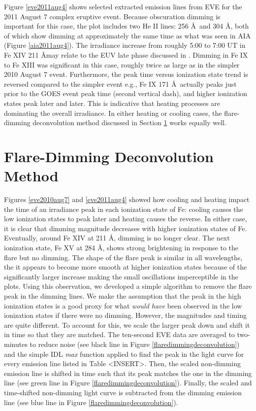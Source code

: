 Figure \ref{eve2011aug4} shows selected extracted emission lines from EVE for the 2011 August 7 complex eruptive event. Because obscuration dimming is important for this case, the plot includes two He II lines: 256 \AA\ and 304 \AA, both of which show dimming at approximately the same time as what was seen in AIA (Figure \ref{aia2011aug4}). The irradiance increase from roughly 5:00 to 7:00 UT in Fe XIV 211 \AA may relate to the EUV late phase discussed in \citet{Woods2011}. Dimming in Fe IX to Fe XIII was significant in this case, roughly twice as large as in the simpler 2010 August 7 event. Furthermore, the peak time versus ionization state trend is reversed compared to the simpler event e.g., Fe IX 171 \AA\ actually peaks just prior to the GOES event peak time (second vertical dash), and higher ionization states peak later and later. This is indicative that heating processes are dominating the overall irradiance. In either heating or cooling cases, the flare-dimming deconvolution method discussed in Section \ref{sec:deconvolve} works equally well. 

\section{Flare-Dimming Deconvolution Method}
\label{sec:deconvolve}
Figures \ref{eve2010aug7} and \ref{eve2011aug4} showed how cooling and heating impact the time of an irradiance peak in each ionization state of Fe: cooling causes the low ionization states to peak later and heating causes the reverse. In either case, it is clear that dimming magnitude decreases with higher ionization states of Fe. Eventually, around Fe XIV at 211 \AA, dimming is no longer clear. The next ionization state, Fe XV at 284 \AA, shows strong brightening in response to the flare but no dimming. The shape of the flare peak is similar in all wavelengths, the it appears to become more smooth at higher ionization states because of the significantly larger increase making the small oscillations imperceptible in the plots. Using this observation, we developed a simple algorithm to remove the flare peak in the dimming lines. We make the assumption that the peak in the high ionization states is a good proxy for what \textit{would have} been observed in the low ionization states if there were no dimming. However, the magnitudes and timing are quite different. To account for this, we scale the larger peak down and shift it in time so that they are matched. The ten-second EVE data are averaged to two-minutes to reduce noise (see black line in Figure \ref{flaredimmingdeconvolution}) and the simple IDL \textit{max} function applied to find the peak in the light curve for every emission line listed in Table <INSERT>. Then, the scaled non-dimming emission line is shifted in time such that its peak matches the one in the dimming line (see green line in Figure \ref{flaredimmingdeconvolution}). Finally, the scaled and time-shifted non-dimming light curve is subtracted from the dimming emission line (see blue line in Figure \ref{flaredimmingdeconvolution}). 

